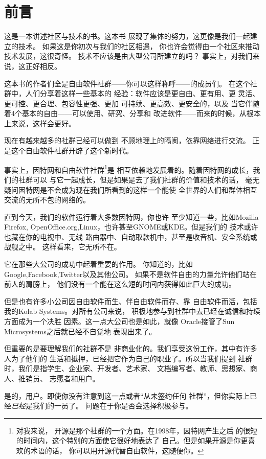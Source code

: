 ﻿\section*{前言}

这是一本讲述社区与技术的书。这本书
展现了集体的努力，这更像是我们一起建立的技术。
如果这是你初次与我们的社区相遇，
你也许会觉得由一个社区来推动技术发展，这很奇怪。
技术不应该是由大型公司所建立的吗？
事实上，对我们来说，这正好相反。

这本书的作者们全是自由软件社群——你可以这样称呼——的成员们。
在这个社群中，人们分享着这样一些基本的
经验：软件应该是更自由、更有用、更
灵活、更可控、更合理、包容性更强、更加
可持续、更高效、更安全的，以及
当它伴随着4个基本的自由——可以使用、研究、分享和
改进软件——而来的时候，从根本上来说，这样会更好。

现在有越来越多的社群已经可以做到
不顾地理上的隔阂，依靠网络进行交流。
正是这个自由软件社群开辟了这个新时代。

事实上，因特网和自由软件社群\footnote{对我来说，
  开源是那个社群的一个方面。在1998年，因特网产生之后
  的很短的时间内，这个特别的方面使它很好地表达了
  自己。但是如果开源是你更喜欢的术语的话，
  你可以用开源代替自由软件，这随便你。}是
相互依赖地发展着的。随着因特网的成长，我们的社群可以
与它一起成长，但是如果是去了我们社群的价值和技术的话，
毫无疑问因特网是不会成为现在我们所看到的这样一个能使
全世界的人们和群体相互交流的无所不包的网络的。

直到今天，我们的软件运行着大多数因特网，你也许
至少知道一些，比如Mozilla Firefox,
OpenOffice.org,Linux，也许甚至GNOME或KDE。但是我们的
技术或许也藏在你的电视中、无线
路由器中、自动取款机中，甚至是收音机、安全系统或战舰之中。
这样看来，它无所不在。

它在那些大公司的成功中起着重要的作用。
你知道的，比如Google,Facebook,Twitter以及其他公司。
如果不是软件自由的力量允许他们站在前人的肩膀上，
他们没有一个能在这么短的时间内获得如此巨大的成功。

但是也有许多小公司因自由软件而生、伴自由软件而存、靠
自由软件而活，包括我的Kolab Systems。对所有公司来说，
积极地参与到社群中去已经在诚信和持续方面成为一个决胜
因素。这一点大公司也是如此，就像
Oracle接管了Sun Microsystems之后就已经不自觉地
表现出来了。

但重要的是要理解我们的社群\textbf{不}是
非商业化的。我们享受这份工作，其中有许多人为了他们的
生活和抵押，已经把它作为自己的职业了。所以当我们提到
社群时，我们是指学生、企业家、开发者、艺术家、
文档编写者、教师、思想家、商人、推销员、
志愿者和用户。

是的，用户。即使你没有注意到这一点或者“从未签约任何
社群”，但你实际上已经\emph{已经}是我们的一员了。
问题在于你是否会选择积极参与。